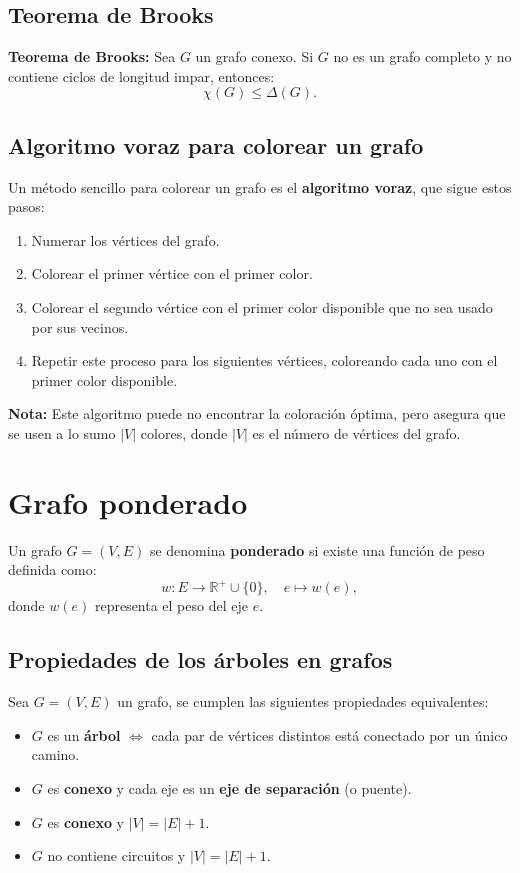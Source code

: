 \documentclass{article}
\begin{document}
\subsection{Teorema de Brooks}
\textbf{Teorema de Brooks:} Sea $G$ un grafo conexo. Si $G$ no es un grafo completo y no contiene ciclos de longitud impar, entonces:
\begin{equation}
    \chi(G) \leq \Delta(G).
\end{equation}

\subsection{Algoritmo voraz para colorear un grafo}
Un método sencillo para colorear un grafo es el \textbf{algoritmo voraz}, que sigue estos pasos:
\begin{enumerate}
    \item Numerar los vértices del grafo.
    \item Colorear el primer vértice con el primer color.
    \item Colorear el segundo vértice con el primer color disponible que no sea usado por sus vecinos.
    \item Repetir este proceso para los siguientes vértices, coloreando cada uno con el primer color disponible.
\end{enumerate}
\textbf{Nota:} Este algoritmo puede no encontrar la coloración óptima, pero asegura que se usen a lo sumo $|V|$ colores, donde $|V|$ es el número de vértices del grafo.

\newpage

\section{Grafo ponderado}

Un grafo $G = (V, E)$ se denomina \textbf{ponderado} si existe una función de peso definida como:
\begin{equation}
    w: E \to \mathbb{R}^+ \cup \{0\}, \quad e \mapsto w(e),
\end{equation}
donde $w(e)$ representa el peso del eje $e$.

\subsection{Propiedades de los árboles en grafos}
Sea $G = (V, E)$ un grafo, se cumplen las siguientes propiedades equivalentes:
\begin{itemize}
    \item $G$ es un \textbf{árbol} \(\iff\) cada par de vértices distintos está conectado por un único camino.
    \item $G$ es \textbf{conexo} y cada eje es un \textbf{eje de separación} (o puente).
    \item $G$ es \textbf{conexo} y $|V| = |E| + 1$.
    \item $G$ no contiene circuitos y $|V| = |E| + 1$.
\end{itemize}
\end{document}
